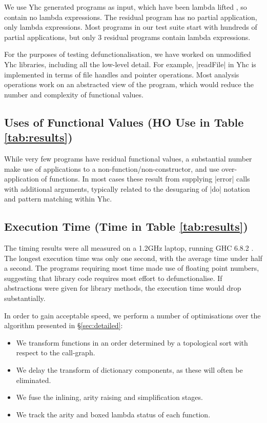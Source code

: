 We use Yhc generated programs as input, which have been lambda lifted \cite{lambda_lift}, so contain no lambda expressions. The residual program has no partial application, only lambda expressions. Most programs in our test suite start with hundreds of partial applications, but only 3 residual programs contain lambda expressions.

For the purposes of testing defunctionalisation, we have worked on unmodified Yhc libraries, including all the low-level detail. For example, |readFile| in Yhc is implemented in terms of file handles and pointer operations. Most analysis operations work on an abstracted view of the program, which would reduce the number and complexity of functional values.

\subsection{Uses of Functional Values (HO Use in Table \ref{tab:results})}

While very few programs have residual functional values, a substantial number make use of applications to a non-function/non-constructor, and use over-application of functions. In most cases these result from supplying |error| calls with additional arguments, typically related to the desugaring of |do| notation and pattern matching within Yhc.

\subsection{Execution Time (Time in Table \ref{tab:results})}
\label{sec:time}

The timing results were all measured on a 1.2GHz laptop, running GHC 6.8.2 \cite{ghc}. The longest execution time was only one second, with the average time under half a second. The programs requiring most time made use of floating point numbers, suggesting that library code requires most effort to defunctionalise. If abstractions were given for library methods, the execution time would drop substantially.

In order to gain acceptable speed, we perform a number of optimisations over the algorithm presented in \S\ref{sec:detailed}:

\begin{itemize}
\item We transform functions in an order determined by a topological sort with respect to the call-graph.
\item We delay the transform of dictionary components, as these will often be eliminated.
\item We fuse the inlining, arity raising and simplification stages.
\item We track the arity and boxed lambda status of each function.
\end{itemize}

